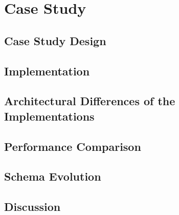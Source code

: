 \section{Case Study}\label{sec:case-study}

\subsection{Case Study Design}

\subsection{Implementation}

\subsection{Architectural Differences of the Implementations}

\subsection{Performance Comparison}

\subsection{Schema Evolution}

\subsection{Discussion}